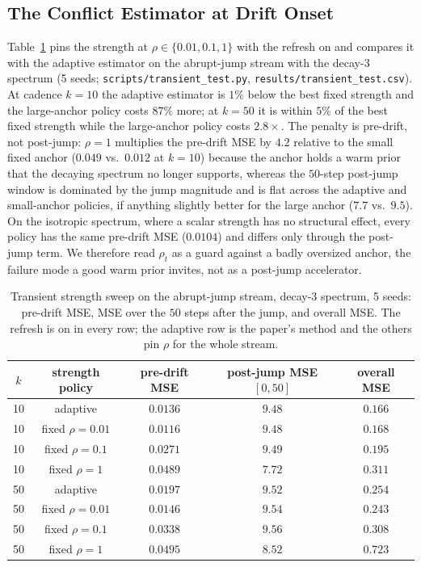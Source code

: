 \documentclass[11pt]{article}
\begin{document}
\subsection{The Conflict Estimator at Drift Onset}
\label{app:transient}

Table~\ref{tab:transient} pins the strength at $\rho \in \{0.01, 0.1, 1\}$ with the refresh on and compares it with the adaptive estimator on the abrupt-jump stream with the decay-3 spectrum (5 seeds; \texttt{scripts/transient\_test.py}, \texttt{results/transient\_test.csv}).
At cadence $k = 10$ the adaptive estimator is $1\%$ below the best fixed strength and the large-anchor policy costs $87\%$ more; at $k = 50$ it is within $5\%$ of the best fixed strength while the large-anchor policy costs $2.8\times$.
The penalty is pre-drift, not post-jump: $\rho = 1$ multiplies the pre-drift MSE by $4.2$ relative to the small fixed anchor ($0.049$ vs.\ $0.012$ at $k = 10$) because the anchor holds a warm prior that the decaying spectrum no longer supports, whereas the $50$-step post-jump window is dominated by the jump magnitude and is flat across the adaptive and small-anchor policies, if anything slightly better for the large anchor ($7.7$ vs.\ $9.5$).
On the isotropic spectrum, where a scalar strength has no structural effect, every policy has the same pre-drift MSE ($0.0104$) and differs only through the post-jump term.
We therefore read $\rho_t$ as a guard against a badly oversized anchor, the failure mode a good warm prior invites, not as a post-jump accelerator.

\begin{table}[!htbp]
\centering
\footnotesize
\caption{Transient strength sweep on the abrupt-jump stream, decay-3 spectrum, 5 seeds: pre-drift MSE, MSE over the $50$ steps after the jump, and overall MSE.
The refresh is on in every row; the adaptive row is the paper's method and the others pin $\rho$ for the whole stream.}
\label{tab:transient}
\begin{tabular}{ccccc}
\toprule
$k$ & strength policy & pre-drift MSE & post-jump MSE $[0,50]$ & overall MSE \\
\midrule
10 & adaptive & $0.0136$ & $9.48$ & $\mathbf{0.166}$ \\
10 & fixed $\rho = 0.01$ & $0.0116$ & $9.48$ & $0.168$ \\
10 & fixed $\rho = 0.1$ & $0.0271$ & $9.49$ & $0.195$ \\
10 & fixed $\rho = 1$ & $0.0489$ & $7.72$ & $0.311$ \\
\midrule
50 & adaptive & $0.0197$ & $9.52$ & $0.254$ \\
50 & fixed $\rho = 0.01$ & $0.0146$ & $9.54$ & $\mathbf{0.243}$ \\
50 & fixed $\rho = 0.1$ & $0.0338$ & $9.56$ & $0.308$ \\
50 & fixed $\rho = 1$ & $0.0495$ & $8.52$ & $0.723$ \\
\bottomrule
\end{tabular}
\end{table}
\end{document}
